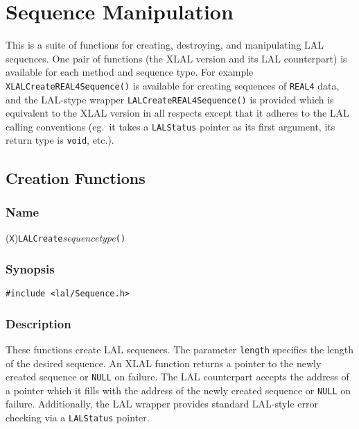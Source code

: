 \clearpage
\section{Sequence Manipulation}
\label{s:SequenceManipulation}

This is a suite of functions for creating, destroying, and manipulating LAL
sequences.  One pair of functions (the XLAL version and its LAL
counterpart) is available for each method and sequence type.  For example
\texttt{XLALCreateREAL4Sequence()} is available for creating sequences of
\texttt{REAL4} data, and the LAL-stype wrapper
\texttt{LALCreateREAL4Sequence()} is provided which is equivalent to the
XLAL version in all respects except that it adheres to the LAL calling
conventions (eg.\ it takes a \texttt{LALStatus} pointer as its first
argument, its return type is \texttt{void}, etc.).

\subsection{Creation Functions}

\subsubsection{Name}

(\texttt{X})\texttt{LALCreate}\textit{sequencetype}\texttt{()}

\subsubsection{Synopsis}

\begin{verbatim}
#include <lal/Sequence.h>
\end{verbatim}


\subsubsection{Description}

These functions create LAL sequences.  The parameter \texttt{length}
specifies the length of the desired sequence.  An XLAL function returns a
pointer to the newly created sequence or \texttt{NULL} on failure.  The LAL
counterpart accepts the address of a pointer which it fills with the
address of the newly created sequence or \texttt{NULL} on failure.
Additionally, the LAL wrapper provides standard LAL-style error checking
via a \texttt{LALStatus} pointer.

